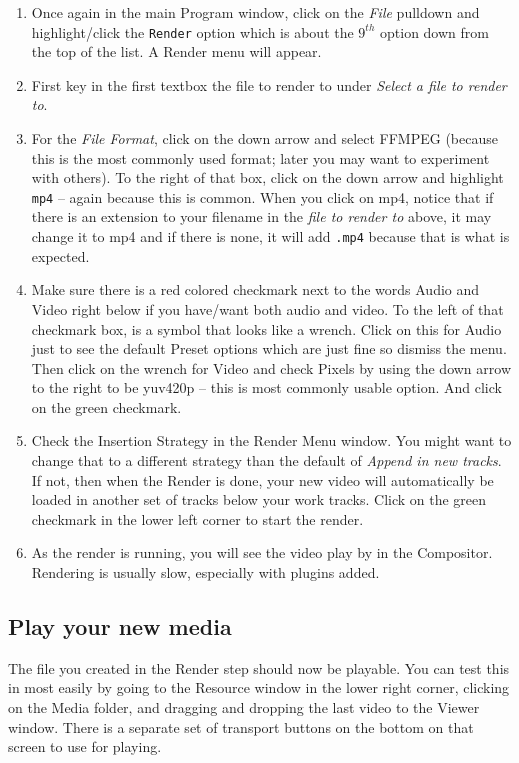 \begin{enumerate}
	\item Once again in the main Program window, click on the \textit{File} pulldown and highlight/click the \texttt{Render}
	option which is about the $9^{th}$ option down from the top of the list.  A \CGG{} Render menu will
	appear.
	\item First key in the first textbox the file to render to under \textit{Select a file to render to}.
	\item For the \textit{File Format}, click on the down arrow and select FFMPEG (because this is the most
	commonly used format; later you may want to experiment with others).  To the right of that box,
	click on the down arrow and highlight \texttt{mp4} -- again because this is common.  When you click on 
	mp4, notice that if there is an extension to your filename in the \textit{file to render to} above, it may
	change it to mp4 and if there is none, it will add \texttt{.mp4} because that is what is expected.
	\item Make sure there is a red colored checkmark next to the words Audio and Video right below if you
	have/want both audio and video.  To the left of that checkmark box, is a symbol that looks like a
	wrench.  Click on this for Audio just to see the default Preset options which are just fine so dismiss
	the menu.  Then click on the wrench for Video and check Pixels by using the down arrow to the
	right to be yuv420p -- this is most commonly usable option.  And click on the green checkmark.
	\item Check the Insertion Strategy in the Render Menu window.  You might want to change that to
	a different strategy than the default of \textit{Append in new tracks}.  If not, then when the Render is done,
	your new video will automatically be loaded in another set of tracks below your work tracks.  Click
	on the green checkmark in the lower left corner to start the render.
	\item As the render is running, you will see the video play by in the Compositor.  Rendering is usually
	slow, especially with plugins added.
\end{enumerate}

\subsection{Play your new media}%
\label{sub:play_your_new_media}

The file you created in the Render step should now be playable.  You can test this in \CGG{} most easily by going to the Resource window in the lower right corner, clicking on the Media folder, and dragging and dropping the last video to the Viewer window.  There is a separate set of transport buttons on the bottom on that screen to use for playing.

